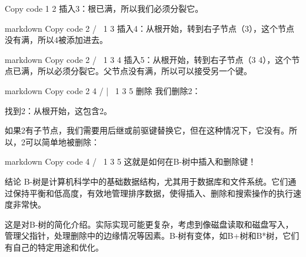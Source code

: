 Copy code
 1 2
插入3：根已满，所以我们必须分裂它。

markdown
Copy code
     2
   /   \
 1       3
插入4：从根开始，转到右子节点（3），这个节点没有满，所以4被添加进去。

markdown
Copy code
     2
   /   \
 1      3 4
插入5：从根开始，转到右子节点（3 4），这个节点已满，所以必须分裂它。父节点没有满，所以可以接受另一个键。

markdown
Copy code
     2 4
   /   |   \
 1      3    5
删除
我们删除2：

找到2：从根开始，这包含2。

如果2有子节点，我们需要用后继或前驱键替换它，但在这种情况下，它没有。所以，2可以简单地被删除：

markdown
Copy code
     4
   /   \
 1      3 5
这就是如何在B-树中插入和删除键！

结论
B-树是计算机科学中的基础数据结构，尤其用于数据库和文件系统。它们通过保持平衡和低高度，有效地管理排序数据，使得插入、删除和搜索操作的执行速度非常快。

这是对B-树的简化介绍。实际实现可能更复杂，考虑到像磁盘读取和磁盘写入，管理父指针，处理删除中的边缘情况等因素。B-树有变体，如B+树和B*树，它们有自己的特定用途和优化。